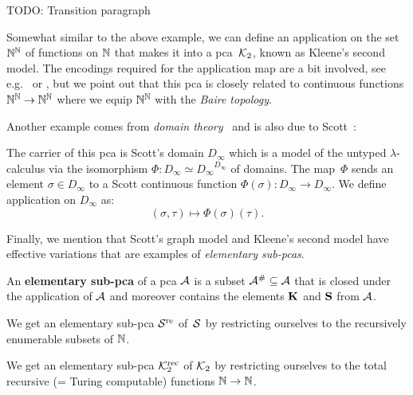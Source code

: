 \textcolor{Mulberry}{TODO: Transition paragraph}
\cite{KleeneVesley1965}
\begin{example}
  Somewhat similar to the above example, we can define an application on the set
  \(\Nat^\Nat\) of functions on \(\Nat\) that makes it into a pca~\(\Ktwo\),
  known as Kleene's second model.
  The encodings required for the application map are a bit involved, see
  e.g.~\cite[p.~30 and Section~2.1.2]{Bauer2023} or
  \cite[Section~1.4.3]{vanOosten2008}, but we point out that this pca is closely
  related to continuous functions \(\Nat^\Nat \to \Nat^\Nat\) where we equip
  \(\Nat^\Nat\) with the \emph{Baire topology}.
\end{example}

Another example comes from \emph{domain theory}~\cite{AmadioCurien1998} and is
also due to Scott~\cite{Scott1972}:
\begin{example}
  The carrier of this pca is Scott's domain \(D_\infty\) which is a model of the
  untyped \(\lambda\)-calculus via the isomorphism
  \(\Phi \colon D_\infty \simeq {D_\infty}^{D_\infty}\) of domains.
  The map~\(\Phi\) sends an element \(\sigma \in D_\infty\) to a Scott
  continuous function \(\Phi(\sigma) \colon D_\infty \to D_\infty\).
  We define application on \(D_\infty\) as:
  \[
    (\sigma,\tau) \mapsto \Phi(\sigma)(\tau).
  \]
\end{example}

Finally, we mention that Scott's graph model and Kleene's second model have
effective variations that are examples of \emph{elementary sub-pcas}.

\begin{definition}
  An \textbf{elementary sub-pca} of a pca \(\AA\) is a subset
  \(\AA^\# \subseteq \AA\) that is closed under the application of \(\AA\) and
  moreover contains the elements \(\kcomb\) and \(\scomb\) from \(\AA\).
\end{definition}

\begin{example}
  We get an elementary sub-pca \(\Scottre\) of~\(\Scott\) by restricting
  ourselves to the recursively enumerable subsets of \(\Nat\).
\end{example}

\begin{example}
  We get an elementary sub-pca \(\Ktworec\) of \(\Ktwo\) by restricting
  ourselves to the total recursive (= Turing computable) functions
  \(\Nat \to \Nat\).
\end{example}

